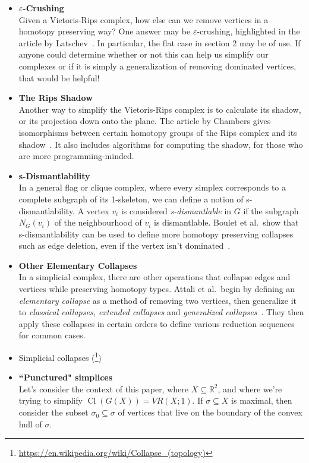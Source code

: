 \documentclass[amscd, amssymb, verbatim]{amsart}[12pt]
\theoremstyle{plain}
\theoremstyle{definition}
\newcommand{\R}{\mathbb{R}}
\DeclareMathOperator{\cl}{Cl}
\begin{document}
\begin{itemize}
\item \textbf{$\varepsilon$-Crushing} \\
Given a Vietoris-Rips complex, how else can we remove vertices in a homotopy preserving way? One answer may be $\varepsilon$-crushing, highlighted in the article by Latschev~\cite{Latschev2001}.
In particular, the flat case in section 2 may be of use. 
If anyone could determine whether or not this can help us simplify our complexes or if it is simply a generalization of removing dominated vertices, that would be helpful!
\item \textbf{The Rips Shadow} \\
Another way to simplify the Vietoris-Rips complex is to calculate its shadow, or its projection down onto the plane.
The article by Chambers gives isomorphisms between certain homotopy groups of the Rips complex and its shadow~\cite{Chambers2008}. It also includes algorithms for computing the shadow, for those who are more programming-minded.
\item \textbf{s-Dismantlability} \\
In a general flag or clique complex, where every simplex corresponds to a complete subgraph of its 1-skeleton, we can define a notion of s-dismantlability.
A vertex $v_i$ is considered \textit{s-dismantlable} in $G$ if the subgraph $N_{G}(v_i)$ of the neighbourhood of $v_i$ is dismantlable.
Boulet et al.\ show that s-dismantlability can be used to define more homotopy preserving collapses such as edge deletion, even if the vertex isn't dominated~\cite{Boulet2010}.
\item \textbf{Other Elementary Collapses} \\
In a simplicial complex, there are other operations that collapse edges and vertices while preserving homotopy types. Attali et al.\ begin by defining an \textit{elementary collapse} as a method of removing two vertices, then generalize it to \textit{classical collapses, extended collapses} and \textit{generalized collapses}~\cite{Attali2013}.
They then apply these collapses in certain orders to define various reduction sequences for common cases.
\item Simplicial collapses (\footnote{\url{https://en.wikipedia.org/wiki/Collapse\_(topology)}})
\item \textbf{``Punctured" simplices} \\
Let's consider the context of this paper, where $X\subseteq \R^2$, and where we're trying to simplify $\cl(G(X))=VR(X;1)$. If $\sigma\subseteq X$ is maximal, then consider the subset $\sigma_0\subseteq \sigma$ of vertices that live on the boundary of the convex hull of $\sigma$. 

\end{itemize}
\end{document}
